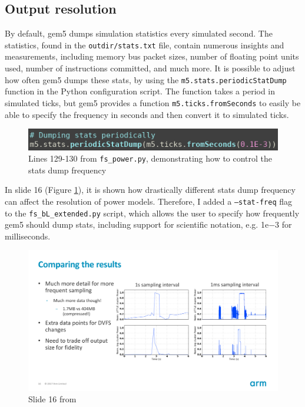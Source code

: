     \subsection{Output resolution}
    By default, gem5 dumps simulation statistics every simulated second. The 
    statistics, found in the \texttt{outdir/stats.txt} file, contain numerous 
    insights and measurements, including memory bus packet sizes, number of 
    floating point units used, number of instructions committed, and much more. 
    It is possible to adjust how often gem5 dumps these stats, by using the 
    \texttt{m5.stats.periodicStatDump} function in the Python configuration 
    script. The function takes a period in simulated ticks, but gem5 provides a 
    function \texttt{m5.ticks.fromSeconds} to easily be able to specify the 
    frequency in seconds and then convert it to simulated ticks.
    \begin{figure}[H]
        \centering
        \includegraphics[width=0.6\linewidth]{screenshots/config-exts/periodic-dump-stats.png}
        \caption{Lines 129-130 from \texttt{fs\_power.py}, demonstrating how to 
                 control the stats dump frequency}
    \end{figure}
    In \cite{bischoff_gem5_2017-1} slide 16 (Figure 
    \ref{fig:bischoff-gem5-s16}), it is shown how drastically different stats 
    dump frequency can affect the resolution of power models. Therefore, I 
    added a \texttt{--stat-freq} flag to the \texttt{fs\_bL\_extended.py} 
    script, which allows the user to specify how frequently gem5 should dump 
    stats, including support for scientific notation, e.g. {\sffamily 1e$-$3} 
    for milliseconds.
    \begin{figure}[H]
        \centering
        \includegraphics[width=0.9\linewidth]{screenshots/empowering-the-masses-s16.png}
        \caption{Slide 16 from \cite{bischoff_gem5_2017-1}}
        \label{fig:bischoff-gem5-s16}
    \end{figure}
